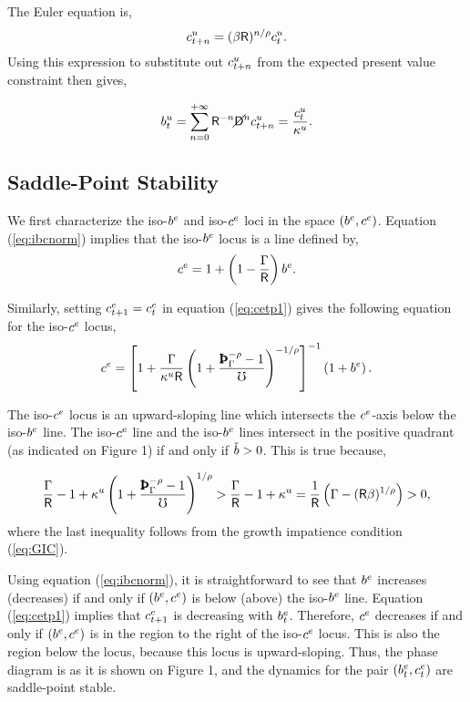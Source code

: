 \documentclass[titlepage,abstract,letterpaper]{econtex}
\begin{document}
The Euler equation is,
\begin{equation*}
c_{t+n}^u=(\beta \mathsf{R})^{n/\rho} c^{u}_{t}.
\end{equation*}
Using this expression to substitute out $c^u_{t+n}$ from the expected present value constraint then gives,

\begin{equation*}
b^{u}_t = \sum_{n=0}^{+\infty} \mathsf{R}^{-n} \cancel{\mathsf{D}}^{n} c_{t+n}^u = \frac{c^{u}_{t}}{\kappa^{u}}.
\end{equation*}

\subsection{Saddle-Point Stability}

We first characterize the iso-$b^{e}$ and iso-$c^{e}$ loci in the space $(b^{e} , c^{e})$. Equation (\ref{eq:ibcnorm}) implies that the iso-$b^{e}$ locus is a line defined by,
\begin{equation*}
c^{e} = 1+\left(1-\frac{\Gamma}{\mathsf{R}} \right)b^{e}.
\end{equation*}

Similarly, setting $c^{e}_{t+1} = c^{e}_t$ in equation (\ref{eq:cetp1}) gives the following equation for the iso-$c^{e}$ locus,
\begin{equation*}
\cRatE = \left[1+\frac{\PGro}{\MPCU \Rfree}\left(1+\frac{\PatPGro^{-\CRRA}-1}{\urate}\right)^{-1/\CRRA}\right]^{-1} \left(1+ \bRatE \right).
\end{equation*}

The iso-$c^{e}$ locus is an upward-sloping line which intersects the $c^{e}$-axis below the iso-$b^{e}$ line. The iso-$c^{e}$ line and the iso-$b^{e}$ lines intersect in the positive quadrant (as indicated on Figure 1) if and only if $\check{b} > 0$. This is true because,

\begin{equation*}
\frac{\PGro}{\Rfree}-1+ \MPCU \left(1+\frac{\PatPGro^{-\CRRA}-1}{\urate}\right)^{1/\CRRA}
> \frac{\PGro}{\Rfree}-1+\MPCU = \frac{1}{\Rfree}\left(\PGro-(\Rfree \Discount)^{1/\CRRA}\right)>0,
\end{equation*}
where the last inequality follows from the growth impatience condition (\ref{eq:GIC}).

Using equation (\ref{eq:ibcnorm}), it is straightforward  to see that $b^{e}$ increases (decreases) if and only if $(b^{e}, c^{e})$ is below (above) the iso-$b^{e}$ line. Equation (\ref{eq:cetp1}) implies that $c^{e}_{t+1}$ is decreasing with $b^{e}_t$. Therefore, $c^{e}$ decreases if and only if $(b^{e}, c^{e})$ is in the region to the right of the iso-$c^{e}$ locus. This is also the region below the locus, because this locus is upward-sloping. Thus, the phase diagram is as it is shown on Figure 1, and the dynamics for the pair $(b^{e} _t, c^{e}_t)$ are saddle-point stable.
\end{document}
